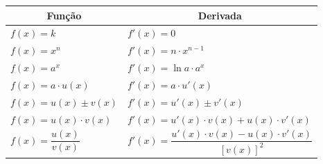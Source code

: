 \begin{frame}{}
    \begin{table}[H]
    \renewcommand{\arraystretch}{1.5}
    \footnotesize
    \begin{tabular}{ll}
    \multicolumn{1}{c}{\textbf{Função}}            & \multicolumn{1}{c}{\textbf{Derivada}}                                         \\ \hline
    \multicolumn{1}{|l|}{$f(x)=k$}                 & \multicolumn{1}{l|}{$f'(x)=0$}                                                \\ \hline
    \multicolumn{1}{|l|}{$f(x)=x^n$}               & \multicolumn{1}{l|}{$f'(x)=n \cdot x^{n-1}$}                                  \\ \hline
    \multicolumn{1}{|l|}{$f(x)=a^x$}               & \multicolumn{1}{l|}{$f'(x)=\ln a \cdot a^x$}                                  \\ \hline
    \multicolumn{1}{|l|}{$f(x)=a\cdot u(x)$}       & \multicolumn{1}{l|}{$f'(x)=a\cdot u'(x)$}                                     \\ \hline
    \multicolumn{1}{|l|}{$f(x)=u(x)\pm v(x)$}      & \multicolumn{1}{l|}{$f'(x)=u'(x)\pm v'(x)$}                                   \\ \hline
    \multicolumn{1}{|l|}{$f(x)=u(x)\cdot v(x)$}     & \multicolumn{1}{l|}{$f'(x)=u'(x)\cdot v(x)+u(x)\cdot v'(x)$}                  \\ \hline
    \multicolumn{1}{|l|}{$f(x)=\dfrac{u(x)}{v(x)}$} & \multicolumn{1}{l|}{$f'(x)=\dfrac{u'(x)\cdot v(x)-u(x)\cdot v'(x)}{[v(x)]^2}$} \\ \hline
    \end{tabular}
\end{table}
\end{frame}
